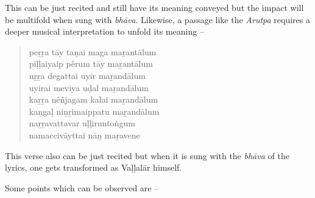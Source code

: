 This can be just recited and still have its meaning conveyed but the impact will be multifold when sung with \textit{bhāva}. Likewise, a passage like the \textit{Arutpa} requires a deeper musical interpretation to unfold its meaning –

\begin{verse}
\end{verse}

\begin{verse}
peṟṟa tāy taṉai maga maṟantālum\\ piḷḷaiyaip pêrum tāy maṟantālum\\ uṟṟa degattai uyir maṟandālum\\ uyirai meviya uḍal maṟandālum\\ kaṟṟa nêñjagam kalai maṟandālum\\ kaṇgaḷ niṉṟimaippatu maṟandālum\\ naṟṟavattavar uḷḷiruntoṅgum\\ namaccivāyttai nāṉ maṟavene
\end{verse}

This verse also can be just recited but when it is sung with the \textit{bhāva} of the lyrics, one gets transformed as Vaḷḷalār himself.

Some points which can be observed are –

